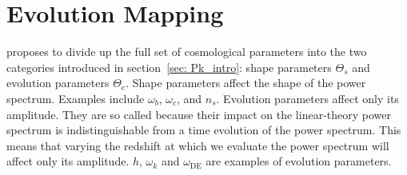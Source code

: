 \begin{comment}

\section{Monte Carlo Markov Chains}




This can be a very brief section, but I want to discuss a little bit of how 
most modern parameter inference works because it motivates the need for 
extremely fast power spectrum computation. It provides a sort of conceptual 
bridge between our ``pure'' goal (quantifying the cosmos) and the nitty-gritty 
bulk of the paper (optimizing emulator performance).

Metropolis-Hastings algorithm.

We don't know what the true probability distribution of power spectra is. In 
order to build this distribution with simulation results, we simply draw from 
the distribution. \textcolor{orange}{Refer to ``Data to Insights'' lecture 
notes in order to tighten this description.}

\end{comment}

\section{Evolution Mapping}
\label{sec: ev_mapping_intro}

\citet{San21} proposes to divide up the full set of cosmological
parameters into the two categories introduced in section~\ref{sec: Pk_intro}: 
shape parameters $\Theta_s$ and evolution parameters $\Theta_e$.
Shape parameters affect the shape of the power spectrum. Examples include
$\omega_b$, $\omega_c$, and $n_s$.
Evolution parameters affect only its amplitude. They are so called because
their impact on the linear-theory power spectrum is 
indistinguishable from a time evolution of the power 
spectrum. This means that varying the redshift at which we evaluate the power
spectrum will affect only its amplitude. $h$, $\omega_k$ and
$\omega_\text{DE}$ are examples of evolution parameters. 


